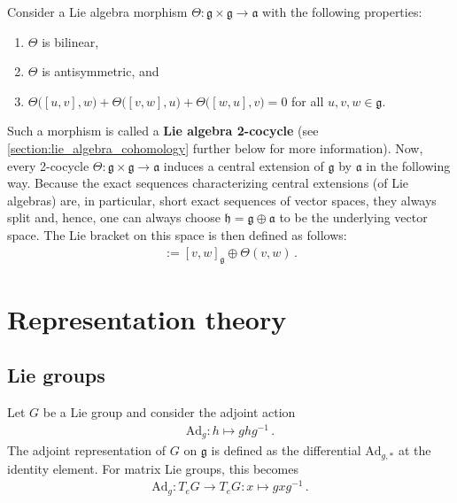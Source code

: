     \begin{construct}\label{lie:cocycle}
        Consider a Lie algebra morphism $\Theta:\mathfrak{g}\times\mathfrak{g}\rightarrow\mathfrak{a}$ with the following properties:
        \begin{enumerate}
            \item $\Theta$ is bilinear,
            \item $\Theta$ is antisymmetric, and
            \item $\Theta\bigl([u,v],w\bigr) + \Theta\bigl([v,w],u\bigr) + \Theta\bigl([w,u],v\bigr) = 0$ for all $u,v,w\in\mathfrak{g}$.
        \end{enumerate}
        Such a morphism is called a \textbf{Lie algebra 2-cocycle} (see \cref{section:lie_algebra_cohomology} further below for more information). Now, every 2-cocycle $\Theta:\mathfrak{g}\times\mathfrak{g}\rightarrow\mathfrak{a}$ induces a central extension of $\mathfrak{g}$ by $\mathfrak{a}$ in the following way. Because the exact sequences characterizing central extensions (of Lie algebras) are, in particular, short exact sequences of vector spaces, they always split and, hence, one can always choose $\mathfrak{h}=\mathfrak{g}\oplus\mathfrak{a}$ to be the underlying vector space. The Lie bracket on this space is then defined as follows:
        \begin{gather}
            [v\oplus\lambda,w\oplus\mu] := [v,w]_{\mathfrak{g}}\oplus\Theta(v,w)\,.
        \end{gather}
    \end{construct}

\section{Representation theory}
\subsection{Lie groups}


    \begin{example}\label{lie:adjoint_representation}
        Let $G$ be a Lie group and consider the adjoint action
        \begin{gather}
            \mathrm{Ad}_g:h\mapsto ghg^{-1}\,.
        \end{gather}
        The adjoint representation of $G$ on $\mathfrak{g}$ is defined as the differential $\mathrm{Ad}_{g,*}$ at the identity element. For matrix Lie groups, this becomes
        \begin{gather}
            \mathrm{Ad}_g:T_eG\rightarrow T_eG:x\mapsto gxg^{-1}\,.
        \end{gather}
    \end{example}

